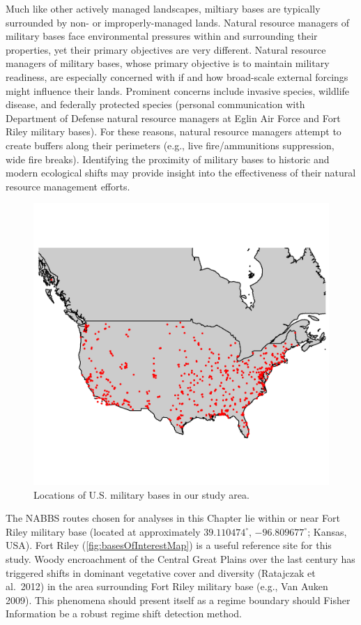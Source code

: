 \documentclass[12pt,twoside,openany]{reedthesis}
\begin{document}
Much like other actively managed landscapes, miltiary bases are typically surrounded by non- or improperly-managed lands. Natural resource managers of military bases face environmental pressures within and surrounding their properties, yet their primary objectives are very different. Natural resource managers of military bases, whose primary objective is to maintain military readiness, are especially concerned with if and how broad-scale external forcings might influence their lands. Prominent concerns include invasive species, wildlife disease, and federally protected species (personal communication with Department of Defense natural resource managers at Eglin Air Force and Fort Riley military bases). For these reasons, natural resource managers attempt to create buffers along their perimeters (e.g., live fire/ammunitions suppression, wide fire breaks). Identifying the proximity of military bases to historic and modern ecological shifts may provide insight into the effectiveness of their natural resource management efforts.
\begin{figure}[h]

{\centering \includegraphics[width=0.85\linewidth]{./chapterFiles/fisherSpatial/figures/figsCalledInDiss/milBases} 

}

\caption{Locations of U.S. military bases in our study area.}\label{fig:milBases}
\end{figure}
The NABBS routes chosen for analyses in this Chapter lie within or near Fort Riley military base (located at approximately \(39.110474^{\circ}\), \(-96.809677^{\circ}\); Kansas, USA). Fort Riley (\ref{fig:basesOfInterestMap}) is a useful reference site for this study. Woody encroachment of the Central Great Plains over the last century has triggered shifts in dominant vegetative cover and diversity (Ratajczak et al.~2012) in the area surrounding Fort Riley military base (e.g., Van Auken 2009). This phenomena should present itself as a regime boundary should Fisher Information be a robust regime shift detection method.
\end{document}
